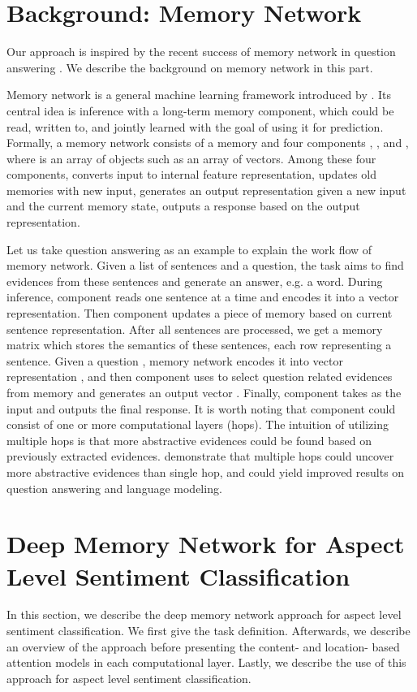 \documentclass[11pt,letterpaper]{article}
\begin{document}
\section{Background: Memory Network}

Our approach is inspired by the recent success of memory network in question answering \cite{Weston2014memory,Sukhbaatar2015end}. 
We describe the background on memory network in this part.

Memory network is a general machine learning framework introduced by .
Its central idea is inference with a long-term memory component, which could be read, written to, and jointly learned with the goal of using it for prediction.
Formally, a memory network consists of a memory  and four components , ,  and , where 
 is an array of objects such as an array of vectors. 
Among these four components,  converts input to internal feature representation,  updates old memories with new input,  generates an output representation given a new input and the current memory state,  outputs a response based on the output representation. 

Let us take question answering as an example to explain the work flow of memory network. Given a list of sentences and a question, the task aims to find evidences from these sentences and generate an answer, e.g. a word.
During inference,  component reads one sentence  at a time and encodes it into a vector representation.
Then  component updates a piece of memory  based on current sentence representation. 
After all sentences are processed, we get a memory matrix  which stores the semantics of these sentences, each row representing a sentence. 
Given a question , memory network encodes it into vector representation , and then  component uses  to select question related evidences from memory  and generates an output vector . 
Finally,  component takes  as the input and outputs the final response.
It is worth noting that  component could consist of one or more computational layers (hops). 
The intuition of utilizing multiple hops is that more abstractive evidences could be found based on previously extracted evidences.  
 demonstrate that multiple hops could uncover more abstractive evidences than single hop, and could yield improved results on question answering and language modeling. 

\section{Deep Memory Network for Aspect Level Sentiment Classification}
In this section, we describe the deep memory network approach for aspect level sentiment classification. 
We first give the task definition. 
Afterwards, we describe an overview of the approach before presenting the content- and location- based attention models in each computational layer.
Lastly, we describe the use of this approach for aspect level sentiment classification.
\end{document}
